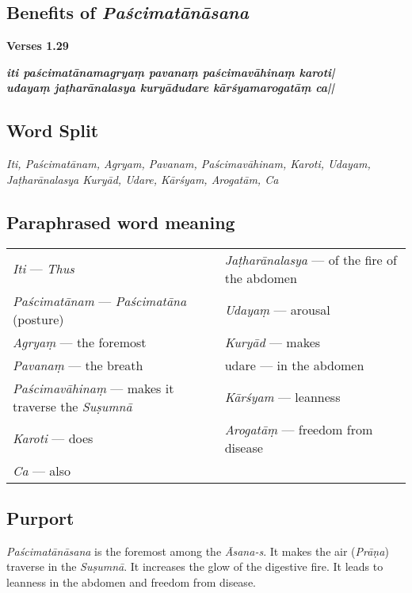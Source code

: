 \subsection*{Benefits of \textit{Paścimatānāsana}}
\vspace{-10pt}

\noindent 
\textbf{Verses 1.29}

\begin{shloka}
\textit{\textbf{iti paścimatānamagryaṃ pavanaṃ paścimavāhinaṃ karoti|}\\
\textbf{udayaṃ jaṭharānalasya kuryādudare kārśyamarogatāṃ ca||}}
\end{shloka}
\vspace{-5pt}

\subsection*{Word Split}
\vspace{-5pt}

\textit{Iti, Paścimatānam, Agryam, Pavanam, Paścimavāhinam, Karoti, Udayam, Jaṭharānalasya Kuryād, Udare, Kārśyam, Arogatām, Ca}

\subsection*{Paraphrased word meaning}
\vspace{-10pt}

\begin{longtable}{>{\noindent\raggedright}p{5cm}>{\noindent\raggedright}p{5cm}}
\textit{Iti} --- \textit{Thus} & \textit{Jaṭharānalasya} --- of the fire of the abdomen\tabularnewline
\textit{Paścimatānam} --- \textit{Paścimatāna} (posture) & \textit{Udayaṃ} --- arousal\tabularnewline
\textit{Agryaṃ}  --- the foremost &  \textit{Kuryād} --- makes\tabularnewline
\textit{Pavanaṃ} --- the breath  & udare --- in the abdomen\tabularnewline
\textit{Paścimavāhinaṃ} --- makes it traverse the \textit{Suṣumnā} & \textit{Kārśyam} --- leanness\tabularnewline
\textit{Karoti} --- does & \textit{Arogatāṃ} --- freedom from disease \tabularnewline
\textit{Ca} --- also & 
\end{longtable}
\vspace{-10pt}

\subsection*{Purport}

\textit{Paścimatānāsana} is the foremost among the \textit{Āsana-s}. It makes the air (\textit{Prāṇa}) traverse in the \textit{Suṣumnā}. It increases the glow of the digestive fire. It leads to leanness in the abdomen and freedom from disease.
\vspace{-5pt}

